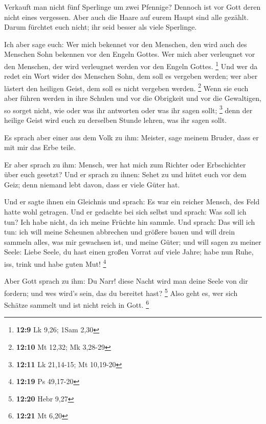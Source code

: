  Verkauft man nicht fünf Sperlinge um zwei Pfennige?
Dennoch ist vor Gott deren nicht eines vergessen.  Aber
auch die Haare auf eurem Haupt sind alle gezählt. Darum fürchtet euch
nicht; ihr seid besser als viele Sperlinge.

 Ich aber sage euch: Wer mich bekennet vor den Menschen,
den wird auch des Menschen Sohn bekennen vor den Engeln Gottes.
 Wer mich aber verleugnet vor den Menschen, der wird
verleugnet werden vor den Engeln Gottes. \footnote{\textbf{12:9} Lk
  9,26; 1Sam 2,30}  Und wer da redet ein Wort wider des
Menschen Sohn, dem soll es vergeben werden; wer aber lästert den
heiligen Geist, dem soll es nicht vergeben werden. \footnote{\textbf{12:10}
  Mt 12,32; Mk 3,28-29}  Wenn sie euch aber führen werden
in ihre Schulen und vor die Obrigkeit und vor die Gewaltigen, so sorget
nicht, wie oder was ihr antworten oder was ihr sagen sollt; \footnote{\textbf{12:11}
  Lk 21,14-15; Mt 10,19-20}  denn der heilige Geist wird
euch zu derselben Stunde lehren, was ihr sagen sollt.

 Es sprach aber einer aus dem Volk zu ihm: Meister, sage
meinem Bruder, dass er mit mir das Erbe teile.

 Er aber sprach zu ihm: Mensch, wer hat mich zum Richter
oder Erbschichter über euch gesetzt?  Und er sprach zu
ihnen: Sehet zu und hütet euch vor dem Geiz; denn niemand lebt davon,
dass er viele Güter hat.

 Und er sagte ihnen ein Gleichnis und sprach: Es war ein
reicher Mensch, des Feld hatte wohl getragen.  Und er
gedachte bei sich selbst und sprach: Was soll ich tun? Ich habe nicht,
da ich meine Früchte hin sammle.  Und sprach: Das will
ich tun: ich will meine Scheunen abbrechen und größere bauen und will
drein sammeln alles, was mir gewachsen ist, und meine Güter;
 und will sagen zu meiner Seele: Liebe Seele, du hast
einen großen Vorrat auf viele Jahre; habe nun Ruhe, iss, trink und habe
guten Mut! \footnote{\textbf{12:19} Ps 49,17-20}

 Aber Gott sprach zu ihm: Du Narr! diese Nacht wird man
deine Seele von dir fordern; und wes wird's sein, das du bereitet hast?
\footnote{\textbf{12:20} Hebr 9,27}  Also geht es, wer
sich Schätze sammelt und ist nicht reich in Gott. \footnote{\textbf{12:21}
  Mt 6,20}

